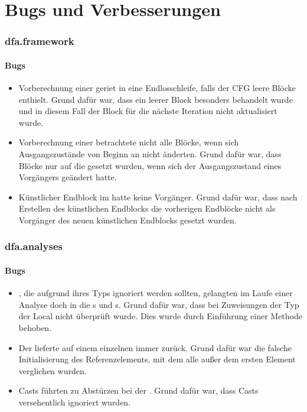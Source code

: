\part{Bugs und Verbesserungen}

\section{dfa.framework}
\subsection{Bugs}

\begin{itemize}
	\item Vorberechnung einer  geriet in eine Endlosschleife, falls der CFG leere Blöcke enthielt.
	Grund dafür war, dass ein leerer Block besonders behandelt wurde und in diesem Fall der Block für die nächste Iteration nicht aktualisiert wurde.
	\item Vorberechnung einer  betrachtete nicht alle Blöcke, wenn sich Ausgangszustände von Beginn an nicht änderten. Grund dafür war, dass Blöcke nur auf die  gesetzt wurden, wenn sich der Ausgangszustand eines Vorgängers geändert hatte. 
	\item Künstlicher Endblock im  hatte keine Vorgänger. Grund dafür war, dass nach Erstellen des künstlichen Endblocks die vorherigen Endblöcke nicht als Vorgänger des neuen künstlichen Endblocks gesetzt wurden.
\end{itemize}

\section{dfa.analyses}
\subsection{Bugs}

\begin{itemize}
	\item {}, die aufgrund ihres Typs ignoriert werden sollten, gelangten im Laufe einer Analyse doch in die s und s. Grund dafür war, dass bei Zuweisungen der Typ der Local nicht überprüft wurde. Dies wurde durch Einführung einer Methode  behoben.
	\item Der  lieferte auf einem einzelnen  immer  zurück. Grund dafür war die falsche Initialisierung des Referenzelements, mit dem alle außer dem ersten Element verglichen wurden.
	\item Casts führten zu Abstürzen bei der . Grund dafür war, dass Casts versehentlich ignoriert wurden.
\end{itemize}

